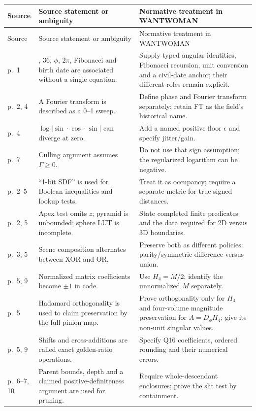 \documentclass[11pt,a4paper]{article}
\numberwithin{equation}{section}
\begin{document}
\small
\begin{longtable}{@{}>{\raggedright\arraybackslash}p{16mm}>{\raggedright\arraybackslash}p{51mm}>{\raggedright\arraybackslash}p{90mm}@{}}
\toprule
Source & Source statement or ambiguity & Normative treatment in WANTWOMAN\\
\midrule
\endfirsthead
\toprule
Source & Source statement or ambiguity & Normative treatment in WANTWOMAN\\
\midrule
\endhead
p.~1 & 3.6, 36, $\phi$, $2\pi$, Fibonacci and birth date are associated without a single equation. & Supply typed angular identities, Fibonacci recursion, unit conversion and a civil-date anchor; their different roles remain explicit.\\
p.~2, 4 & A Fourier transform is described as a 0--1 sweep. & Define phase and Fourier transform separately; retain FT as the field's historical name.\\
p.~4 & $\log|\sin\cdot\cos\cdot\sin|$ can diverge at zero. & Add a named positive floor $\epsilon$ and specify jitter/gain.\\
p.~7 & Culling argument assumes $\Gamma\ge0$. & Do not use that sign assumption; the regularized logarithm can be negative.\\
p.~2--5 & ``1-bit SDF'' is used for Boolean inequalities and lookup tests. & Treat it as occupancy; require a separate metric for true signed distances.\\
p.~2, 5 & Apex test omits $z$; pyramid is unbounded; sphere LUT is incomplete. & State completed finite predicates and the data required for 2D versus 3D boundaries.\\
p.~3, 5 & Scene composition alternates between XOR and OR. & Preserve both as different policies: parity/symmetric difference versus union.\\
p.~5, 9 & Normalized matrix coefficients become $\pm1$ in code. & Use $H_4=M/2$; identify the unnormalized $M$ separately.\\
p.~5 & Hadamard orthogonality is used to claim preservation by the full pinion map. & Prove orthogonality only for $H_4$ and four-volume magnitude preservation for $A=D_\phi H_4$; give its non-unit singular values.\\
p.~5, 9 & Shifts and cross-additions are called exact golden-ratio operations. & Specify Q16 coefficients, ordered rounding and their numerical errors.\\
p.~6--7, 10 & Parent bounds, depth and a claimed positive-definiteness argument are used for pruning. & Require whole-descendant enclosures; prove the slit test by containment.\\

\end{longtable}
\end{document}
